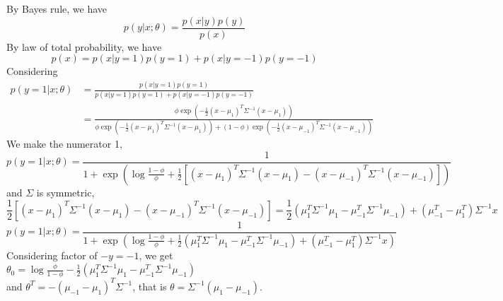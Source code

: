 \documentclass[11pt]{article}
\begin{document}
By Bayes rule, we have $$p(y|x; \theta) = \frac{p(x|y)p(y)}{p(x)}$$
By law of total probability, we have $$p(x) = p(x|y=1)p(y=1)+p(x|y=-1)p(y=-1)$$
Considering
\begin{align*}
  p(y=1|x; \theta) &= \frac{p(x|y=1)p(y=1)}{p(x|y=1)p(y=1)+p(x|y=-1)p(y=-1)} \\
 ~& =\frac{\phi\exp\left(-\frac{1}{2}\left(x-\mu_{1}\right)^T\Sigma^{-1}\left(x-\mu_{1}\right)\right)}{\phi\exp\left(-\frac{1}{2}\left(x-\mu_{1}\right)^T\Sigma^{-1}\left(x-\mu_{1}\right)\right)+(1-\phi)\exp\left(-\frac{1}{2}\left(x-\mu_{-1}\right)^T\Sigma^{-1}\left(x-\mu_{-1}\right)\right)}
\end{align*}
We make the numerator 1, $$ p(y=1|x; \theta) = \frac{1}{1+\exp\left(\log\frac{1-\phi}{\phi}+\frac{1}{2}\left[(x-\mu_{1})^T\Sigma^{-1}(x-\mu_{1})-(x-\mu_{-1})^T\Sigma^{-1}(x-\mu_{-1})\right]\right)}$$
and $\Sigma$ is symmetric, $$\frac{1}{2}\left[(x-\mu_{1})^T\Sigma^{-1}(x-\mu_{1})-(x-\mu_{-1})^T\Sigma^{-1}(x-\mu_{-1})\right] = \frac{1}{2}\left(\mu_1^T\Sigma^{-1}\mu_1-\mu_{-1}^T\Sigma^{-1}\mu_{-1}\right)+(\mu_{-1}^T-\mu_{1}^T)\Sigma^{-1}x$$
$$p(y=1|x; \theta) = \frac{1}{1+\exp\left(\log\frac{1-\phi}{\phi}+\frac{1}{2}\left(\mu_1^T\Sigma^{-1}\mu_1-\mu_{-1}^T\Sigma^{-1}\mu_{-1}\right)+(\mu_{-1}^T-\mu_{1}^T)\Sigma^{-1}x \right)}$$
Considering factor of $-y = -1$, we get $\theta_0 = \log\frac{\phi}{1-\phi}-\frac{1}{2}\left(\mu_1^T\Sigma^{-1}\mu_1-\mu_{-1}^T\Sigma^{-1}\mu_{-1}\right)$ \\
and $\theta^T = -(\mu_{-1}-\mu_{1})^T\Sigma^{-1}$, that is $\theta = \Sigma^{-1}(\mu_{1}-\mu_{-1})$.
\end{document}

